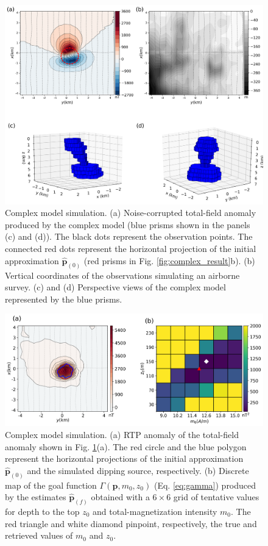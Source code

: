 \begin{figure}
    \centering
    \includegraphics[width=\linewidth]{figures/complex_model_data.png}
    \caption{Complex model simulation. (a) Noise-corrupted total-field anomaly produced by the complex model (blue prisms shown in the panels (c) and (d)). The black dots represent the observation points. The connected red dots represent the horizontal projection 
   	of the initial approximation $\hat{\mathbf{p}}_{(0)}$ 
   	(red prisms in Fig. \ref{fig:complex_result}b). (b) Vertical coordinates of the observations simulating an airborne survey. (c) and (d) Perspective views of the complex model represented by the blue prisms.
}
    \label{fig:complex_model}
\end{figure}

\begin{figure}
    \centering
    \includegraphics[width=\linewidth]{figures/complex_rtp.png}
    \caption{Complex model simulation. (a) RTP anomaly of the total-field anomaly
    shown in Fig. \ref{fig:complex_model}(a). 
	The red circle and the blue polygon represent the horizontal projections of the
	initial approximation $\hat{\mathbf{p}}_{(0)}$ and  the simulated dipping source,
	respectively.
	(b) Discrete map of the goal function $\Gamma(\mathbf{p}, m_0, z_0)$ (Eq.
	\ref{eq:gamma}) produced by the estimates $\hat{\mathbf{p}}_{(f)}$ obtained with
	a $6 \times 6$ grid of tentative values for depth to the top $z_0$ and
	total-magnetization intensity $m_0$.
	The red triangle and white diamond pinpoint, respectively, the true and
	retrieved values of $m_0$ and $z_0$.     
}
    \label{fig:complex_rtp}
\end{figure}

